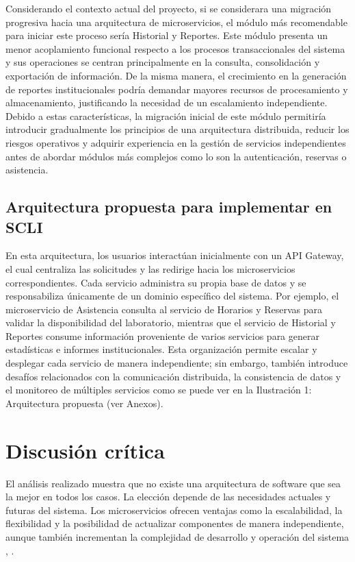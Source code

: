 \documentclass[10pt,conference]{IEEEtran}
\begin{document}
Considerando el contexto actual del proyecto, si se considerara una migración progresiva hacia una arquitectura de microservicios, el módulo más recomendable para iniciar este proceso sería Historial y Reportes. Este módulo presenta un menor acoplamiento funcional respecto a los procesos transaccionales del sistema y sus operaciones se centran principalmente en la consulta, consolidación y exportación de información. De la misma manera, el crecimiento en la generación de reportes institucionales podría demandar mayores recursos de procesamiento y almacenamiento, justificando la necesidad de un escalamiento independiente. Debido a estas características, la migración inicial de este módulo permitiría introducir gradualmente los principios de una arquitectura distribuida, reducir los riesgos operativos y adquirir experiencia en la gestión de servicios independientes antes de abordar módulos más complejos como lo son la autenticación, reservas o asistencia.

\subsection{Arquitectura propuesta para implementar en SCLI}
En esta arquitectura, los usuarios interactúan inicialmente con un API Gateway, el cual centraliza las solicitudes y las redirige hacia los microservicios correspondientes. Cada servicio administra su propia base de datos y se responsabiliza únicamente de un dominio específico del sistema. Por ejemplo, el microservicio de Asistencia consulta al servicio de Horarios y Reservas para validar la disponibilidad del laboratorio, mientras que el servicio de Historial y Reportes consume información proveniente de varios servicios para generar estadísticas e informes institucionales. Esta organización permite escalar y desplegar cada servicio de manera independiente; sin embargo, también introduce desafíos relacionados con la comunicación distribuida, la consistencia de datos y el monitoreo de múltiples servicios como se puede ver en la Ilustración 1: Arquitectura propuesta (ver Anexos).

\section{Discusión crítica}
El análisis realizado muestra que no existe una arquitectura de software que sea la mejor en todos los casos. La elección depende de las necesidades actuales y futuras del sistema. Los microservicios ofrecen ventajas como la escalabilidad, la flexibilidad y la posibilidad de actualizar componentes de manera independiente, aunque también incrementan la complejidad de desarrollo y operación del sistema \cite{ref9}, \cite{ref10}.
\end{document}
